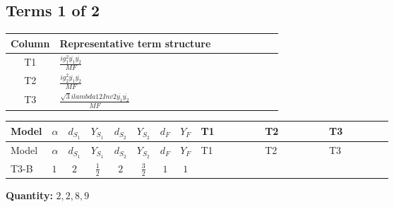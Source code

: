 \documentclass[8pt]{article}
\begin{document}
\begin{landscape}
\subsection*{Terms 1 of 2}
\begin{center}
\begin{tabular}{@{}c >{\raggedright\arraybackslash}p{0.82\linewidth}@{}}
\toprule
Column & Representative term structure \\
\midrule
T1 & \(\displaystyle \frac{i g_{1}^{2} \overline{y_{1}} \overline{y_{2}}}{MF}\) \\
\midrule
T2 & \(\displaystyle \frac{i g_{2}^{2} \overline{y_{1}} \overline{y_{2}}}{MF}\) \\
\midrule
T3 & \(\displaystyle \frac{\sqrt{3} i lambda12Inv2 \overline{y_{1}} \overline{y_{2}}}{MF}\) \\
\midrule
\bottomrule
\end{tabular}
\end{center}
\smallskip
\tiny
\begin{longtable}{@{}llcccccc >{\raggedright\arraybackslash}p{0.21\linewidth} >{\raggedright\arraybackslash}p{0.21\linewidth} >{\raggedright\arraybackslash}p{0.21\linewidth}@{}}
\toprule
Model & $\alpha$ & $d_{S_1}$ & $Y_{S_1}$ & $d_{S_2}$ & $Y_{S_2}$ & $d_F$ & $Y_F$ & T1 & T2 & T3 \\
\midrule
\endfirsthead
\toprule
Model & $\alpha$ & $d_{S_1}$ & $Y_{S_1}$ & $d_{S_2}$ & $Y_{S_2}$ & $d_F$ & $Y_F$ & T1 & T2 & T3 \\
\midrule
\endhead
T3-B & $1$ & $2$ & $\frac{1}{2}$ & $2$ & $\frac{3}{2}$ & $1$ & $1$ & \scriptsize\adjustbox{max width=\linewidth}{$\begin{gathered} - \frac{3 i g_{1}^{2} \overline{y_{1}} \overline{y_{2}}}{2 MF}\end{gathered}$} & \scriptsize\adjustbox{max width=\linewidth}{$\begin{gathered} - \frac{3 i g_{2}^{2} \overline{y_{1}} \overline{y_{2}}}{4 MF}\end{gathered}$} & \scriptsize\adjustbox{max width=\linewidth}{$\begin{gathered} - \frac{\sqrt{3} i lambda12Inv2 \overline{y_{1}} \overline{y_{2}}}{3 MF}\end{gathered}$} \\
\midrule
\bottomrule
\end{longtable}
\clearpage
\noindent\textbf{Quantity: }$\mathrm{2,2,8,9}$\par\smallskip

\end{landscape}
\end{document}
